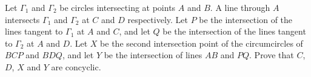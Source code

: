 Let $\Gamma_1$ and $\Gamma_2$ be circles intersecting at points $A$ and $B$. A line through $A$ intersects $\Gamma_1$ and $\Gamma_2$ at $C$ and $D$ respectively. Let $P$ be the intersection of the lines tangent to $\Gamma_1$ at $A$ and $C$, and let $Q$ be the intersection of the lines tangent to $\Gamma_2$ at $A$ and $D$. Let $X$ be the second intersection point of the circumcircles of $BCP$ and $BDQ$, and let $Y$ be the intersection of lines $AB$ and $PQ$. Prove that $C$, $D$, $X$ and $Y$ are concyclic.

